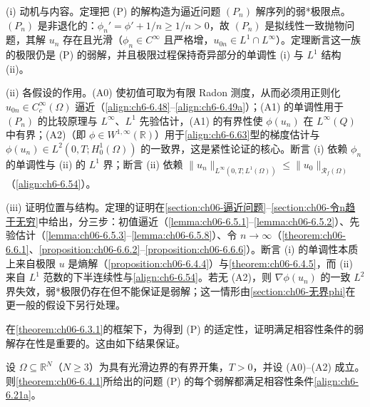 \documentclass[../../main.tex]{subfiles}%
\begin{document}
\begin{remark}\label{remark:ch06-存在动机}
(i) 动机与内容。定理把 (P) 的解构造为逼近问题 $(P_n)$ 解序列的弱*极限点。$(P_n)$ 是非退化的：$\phi_n'=\phi'+1/n\geqslant1/n>0$，故 $(P_n)$ 是拟线性一致抛物问题，其解 $u_n$ 存在且光滑（$\phi_n\in C^\infty$ 且严格增，$u_{0n}\in L^1\cap L^\infty$）。定理断言这一族的极限仍是 (P) 的弱解，并且极限过程保持奇异部分的单调性 (i) 与 $L^1$ 结构 (ii)。

(ii) 各假设的作用。(A0) 使初值可取为有限 Radon 测度，从而必须用正则化 $u_{0n}\in C^\infty_c(\Omega)$ 逼近（\eqref{align:ch6-6.48}--\eqref{align:ch6-6.49a}）；(A1) 的单调性用于 $(P_n)$ 的比较原理与 $L^\infty$、$L^1$ 先验估计，(A1) 的有界性使 $\phi(u_n)$ 在 $L^\infty(Q)$ 中有界；(A2)（即 $\phi\in W^{1,\infty}(\mathbb{R})$）用于\eqref{align:ch6-6.63}型的梯度估计与 $\phi(u_n)\in L^2(0,T;H^1_0(\Omega))$ 的一致界，这是紧性论证的核心。断言 (i) 依赖 $\phi_n$ 的单调性与 (ii) 的 $L^1$ 界；断言 (ii) 依赖 $\|u_n\|_{L^\infty(0,T;L^1(\Omega))}\leqslant\|u_0\|_{\mathscr{R}_f(\Omega)}$（\eqref{align:ch6-6.54}）。

(iii) 证明位置与结构。定理的证明在\cref{section:ch06-逼近问题}--\cref{section:ch06-令n趋于无穷}中给出，分三步：初值逼近（\cref{lemma:ch06-6.5.1}--\cref{lemma:ch06-6.5.2}）、先验估计（\cref{lemma:ch06-6.5.3}--\cref{lemma:ch06-6.5.8}）、令 $n\to\infty$（\cref{theorem:ch06-6.6.1}、\cref{proposition:ch06-6.6.2}--\cref{proposition:ch06-6.6.6}）。断言 (i) 的单调性本质上来自极限 $u$ 是熵解（\cref{proposition:ch06-6.4.4}）与\cref{theorem:ch06-6.4.5}，而 (ii) 来自 $L^1$ 范数的下半连续性与\eqref{align:ch6-6.54}。若无 (A2)，则 $\nabla\phi(u_n)$ 的一致 $L^2$ 界失效，弱*极限仍存在但不能保证是弱解；这一情形由\cref{section:ch06-无界phi}在更一般的假设下另行处理。
\end{remark}

在\cref{theorem:ch06-6.3.1}的框架下，为得到 (P) 的适定性，证明满足相容性条件的弱解存在性是重要的。这由如下结果保证。

\begin{theorem}\label{theorem:ch06-6.4.2}
设 $\Omega\subseteq\mathbb{R}^N$（$N\geqslant3$）为具有光滑边界的有界开集，$T>0$，并设 (A0)--(A2) 成立。则\cref{theorem:ch06-6.4.1}所给出的问题 (P) 的每个弱解都满足相容性条件\eqref{align:ch6-6.21a}。
\end{theorem}
\end{document}
